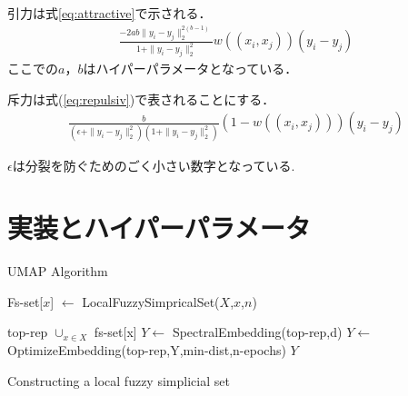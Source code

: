 \documentclass{jsarticle}
\begin{document}
引力は式\ref{eq:attractive}で示される．
\begin{eqnarray}
  \label{eq:attractive}
  \frac{-2ab \| y_i -y_j\| _2 ^{2(b-1)}}{1+\|y_i-y_j\| _2 ^2} w((x_i,x_j))(y_i-y_j)
\end{eqnarray}
ここでの$a$，$b$はハイパーパラメータとなっている．

斥力は式(\ref{eq:repulsiv})で表されることにする．
\begin{eqnarray}
  \frac{b}{(\epsilon + \| y_i - y_j\|_2^2)(1+ \| y_i - y_j\|_2^2)}(1-w((x_i,x_j)))(y_i-y_j)
\end{eqnarray}

$\epsilon$は分裂を防ぐためのごく小さい数字となっている.

\section{実装とハイパーパラメータ}
\begin{algorithm}
  \caption{UMAP Algorithm}
  \label{alg:1}
  \begin{algorithmic}

      \State Fs-set[$x$] $\leftarrow$ LocalFuzzySimpricalSet($X$,$x$,$n$)

      \EndFor
    \State top-rep \leftarrow $\cup _{x \in X}$ fs-set[x]
    \State $Y \leftarrow$ SpectralEmbedding(top-rep,d)
    \State $Y \leftarrow$ OptimizeEmbedding(top-rep,Y,min-dist,n-epochs)
    \State \Return $Y$
    \EndFunction
  \end{algorithmic}
\end{algorithm}

\begin{algorithm}\caption{Constructing a local fuzzy simplicial set}
  \label{alg:2}
  \begin{algorithmic}

  \State knn,knn-distance $Y \leftarrow$ ApproxNearestNeighbors(X,x,n)

  \State \rho $\leftarrow$ knn\_dists[1] \rhd Distance　to　Nearest　Neigbor
  
  \State \sigma $\leftarrow$ SmoothKNNDist(knn-dists,n,\rho) \rhd Smooth　approximator　to　knn-distance
  
  \State fs-set_0 $\leftarrow$ X

  \State fs-set_1 $\leftarrow$ {([x,y],0) |y  $\in$ X}


  \State d_{x,y}$Y \leftarrow$ max\{0,dist(x,y)-\rho\４} / \sigma

  \State  fs_set_1 $Y \leftarrow$ fs\_set $\cup$([x,y],exp(-d_{x,y}))

  \EndFor
  \State \Return fs-set
  \EndFunction
  \end{algorithmic}
\end{algorithm}
\end{document}
